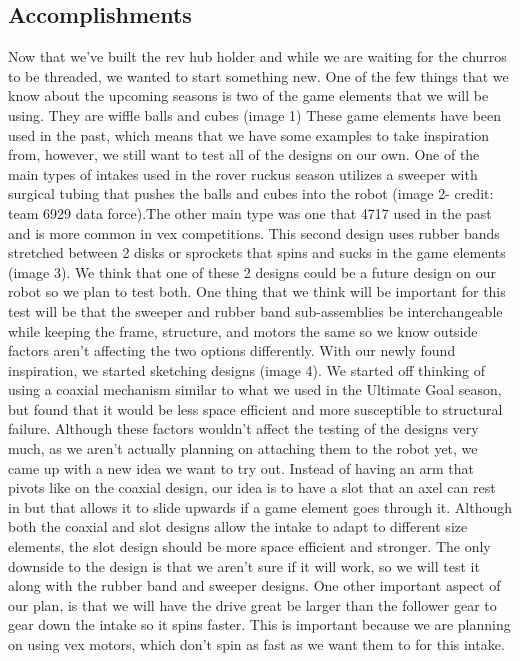 \subsection*{Accomplishments}
Now that we’ve built the rev hub holder and while we are waiting for the churros to be threaded, we wanted to start something new. One of the few things that we know about the upcoming seasons is two of the game elements that we will be using. They are wiffle balls and cubes (image 1) These game elements have been used in the past, which means that we have some examples to take inspiration from, however, we still want to test all of the designs on our own. One of the main types of intakes used in the rover ruckus season utilizes a sweeper with surgical tubing that pushes the balls and cubes into the robot (image 2- credit: team 6929 data force).The other main type was one that 4717 used in the past and is more common in vex competitions. This second design uses rubber bands stretched between 2 disks or sprockets that spins and sucks in the game elements (image 3). We think that one of these 2 designs could be a future design on our robot so we plan to test both. One thing that we think will be important for this test will be that the sweeper and rubber band sub-assemblies be interchangeable while keeping the frame, structure, and motors the same so we know outside factors aren’t affecting the two options differently.
With our newly found inspiration, we started sketching designs (image 4). We started off thinking of using a coaxial mechanism similar to what we used in the Ultimate Goal season, but found that it would be less space efficient and more susceptible to structural failure. Although these factors wouldn’t affect the testing of the designs very much, as we aren't actually planning on attaching them to the robot yet, we came up with a new idea we want to try out. Instead of having an arm that pivots like on the coaxial design, our idea is to have a slot that an axel can rest in but that allows it to slide upwards if a game element goes through it. Although both the coaxial and slot designs allow the intake to adapt to different size elements, the slot design should be more space efficient and stronger. The only downside to the design is that we aren't sure if it will work, so we will test it along with the rubber band and sweeper designs. One other important aspect of our plan, is that we will have the drive great be larger than the follower gear to gear down the intake so it spins faster. This is important because we are planning on using vex motors, which don’t spin as fast as we want them to for this intake.
